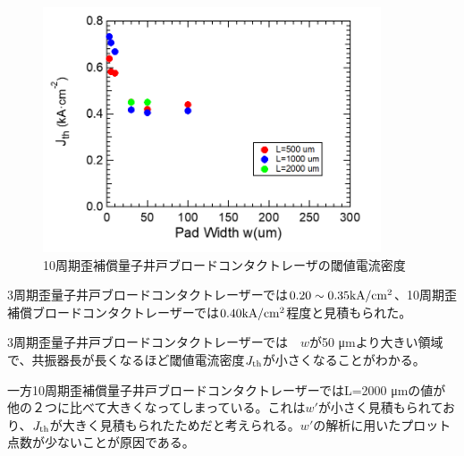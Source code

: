 \begin{figure}[h]
	\centering
	\includegraphics[width=10cm]{figure/fig_3_1_10QW_broadcontact_Jth.png}
		\caption{10周期歪補償量子井戸ブロードコンタクトレーザの閾値電流密度}
		\label{fig:fig_3_1_10QW_broadcontact_Jth}
\end{figure}
3周期歪量子井戸ブロードコンタクトレーザーでは$0.20\sim 0.35  \rm{ kA/cm^{2}}$、10周期歪補償ブロードコンタクトレーザーでは$0.40 \rm{ kA/cm^{2}}$程度と見積もられた。

3周期歪量子井戸ブロードコンタクトレーザーでは　$w$が50 \si{\micro\metre}より大きい領域で、共振器長が長くなるほど閾値電流密度$J_{\rm{th}}$が小さくなることがわかる。

一方10周期歪補償量子井戸ブロードコンタクトレーザーではL=2000 \si{\micro\metre}の値が他の２つに比べて大きくなってしまっている。これは$w'$が小さく見積もられており、$J_{\rm{th}}$が大きく見積もられたためだと考えられる。$w'$の解析に用いたプロット点数が少ないことが原因である。
\clearpage
